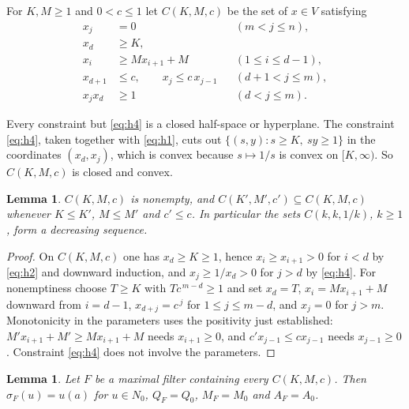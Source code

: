 \documentclass[11pt]{amsart}
\theoremstyle{plain}
\newtheorem{lemma}[theorem]{Lemma}
\theoremstyle{definition}
\begin{document}
For $K,M\ge1$ and $0<c\le1$ let $C(K,M,c)$ be the set of $x\in V$ satisfying
\begin{align}
x_j&=0&&(m<j\le n),\label{eq:h0}\\
x_d&\ge K,\label{eq:h1}\\
x_i&\ge Mx_{i+1}+M&&(1\le i\le d-1),\label{eq:h2}\\
x_{d+1}&\le c,\qquad x_j\le c\,x_{j-1}&&(d+1<j\le m),\label{eq:h3}\\
x_jx_d&\ge1&&(d<j\le m).\label{eq:h4}
\end{align}

Every constraint but \eqref{eq:h4} is a closed half-space or hyperplane. The constraint \eqref{eq:h4}, taken together with \eqref{eq:h1}, cuts out $\{(s,y):s\ge K,\ sy\ge1\}$ in the coordinates $(x_d,x_j)$, which is convex because $s\mapsto1/s$ is convex on $[K,\infty)$. So $C(K,M,c)$ is closed and convex.

\begin{lemma}\label{lem:gen}
$C(K,M,c)$ is nonempty, and $C(K',M',c')\subseteq C(K,M,c)$ whenever $K\le K'$, $M\le M'$ and $c'\le c$. In particular the sets $C(k,k,1/k)$, $k\ge1$, form a decreasing sequence.
\end{lemma}

\begin{proof}
On $C(K,M,c)$ one has $x_d\ge K\ge1$, hence $x_i\ge x_{i+1}>0$ for $i<d$ by \eqref{eq:h2} and downward induction, and $x_j\ge1/x_d>0$ for $j>d$ by \eqref{eq:h4}. For nonemptiness choose $T\ge K$ with $Tc^{\,m-d}\ge1$ and set $x_d=T$, $x_i=Mx_{i+1}+M$ downward from $i=d-1$, $x_{d+j}=c^{\,j}$ for $1\le j\le m-d$, and $x_j=0$ for $j>m$. Monotonicity in the parameters uses the positivity just established: $M'x_{i+1}+M'\ge Mx_{i+1}+M$ needs $x_{i+1}\ge0$, and $c'x_{j-1}\le cx_{j-1}$ needs $x_{j-1}\ge0$. Constraint \eqref{eq:h4} does not involve the parameters.
\end{proof}

\begin{lemma}\label{lem:forcing}
Let $F$ be a maximal filter containing every $C(K,M,c)$. Then $\sigma_F(u)=u(a)$ for $u\in N_0$, $Q_F=Q_0$, $M_F=M_0$ and $A_F=A_0$.
\end{lemma}
\end{document}
